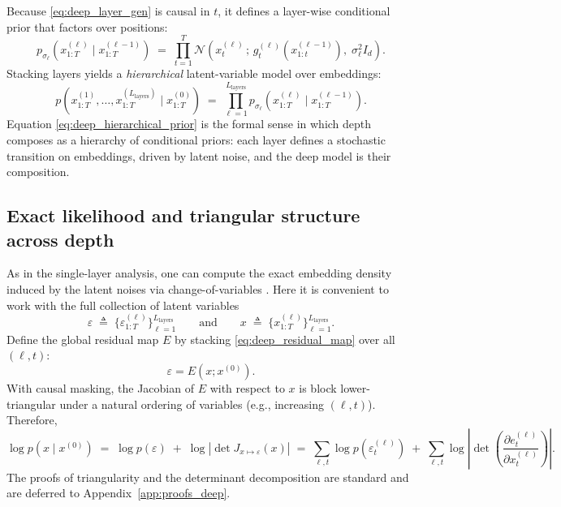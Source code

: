 \documentclass[11pt]{article}
\begin{document}
Because \eqref{eq:deep_layer_gen} is causal in $t$, it defines a layer-wise conditional prior that factors
over positions:
\begin{equation}
p_{\sigma_\ell}\!\left(x^{(\ell)}_{1:T}\mid x^{(\ell-1)}_{1:T}\right)
\;=\;
\prod_{t=1}^T
\mathcal{N}\!\left(
x^{(\ell)}_t \,;\,
g^{(\ell)}_t(x^{(\ell-1)}_{1:t}),
\;\sigma_\ell^2 I_d
\right).
\label{eq:layer_conditional_prior}
\end{equation}
Stacking layers yields a \emph{hierarchical} latent-variable model over embeddings:
\begin{equation}
p\!\left(x^{(1)}_{1:T},\dots,x^{(L_{\mathrm{layers}})}_{1:T}\mid x^{(0)}_{1:T}\right)
\;=\;
\prod_{\ell=1}^{L_{\mathrm{layers}}}
p_{\sigma_\ell}\!\left(x^{(\ell)}_{1:T}\mid x^{(\ell-1)}_{1:T}\right).
\label{eq:deep_hierarchical_prior}
\end{equation}
Equation \eqref{eq:deep_hierarchical_prior} is the formal sense in which depth composes as a hierarchy
of conditional priors: each layer defines a stochastic transition on embeddings, driven by latent noise,
and the deep model is their composition.

\subsection{Exact likelihood and triangular structure across depth}
\label{subsec:deep_loglik}

As in the single-layer analysis, one can compute the exact embedding density induced by the latent noises
via change-of-variables \citep{PapamakariosNaReMoLa21}. Here it is convenient to work with the full collection of latent variables
\[
\varepsilon \;\triangleq\; \{\varepsilon^{(\ell)}_{1:T}\}_{\ell=1}^{L_{\mathrm{layers}}}
\qquad\text{and}\qquad
x \;\triangleq\; \{x^{(\ell)}_{1:T}\}_{\ell=1}^{L_{\mathrm{layers}}}.
\]
Define the global residual map $E$ by stacking \eqref{eq:deep_residual_map} over all $(\ell,t)$:
\[
\varepsilon = E(x; x^{(0)}).
\]
With causal masking, the Jacobian of $E$ with respect to $x$ is block lower-triangular under a natural
ordering of variables (e.g., increasing $(\ell,t)$). Therefore,
\begin{equation}
\log p(x\mid x^{(0)})
\;=\;
\log p(\varepsilon)
\;+\;
\log\left|\det J_{x\mapsto\varepsilon}(x)\right|
\;=\;
\sum_{\ell,t}\log p(\varepsilon^{(\ell)}_t)
\;+\;
\sum_{\ell,t}\log\left|\det\!\left(\frac{\partial e^{(\ell)}_t}{\partial x^{(\ell)}_t}\right)\right|.
\label{eq:deep_logdet_decomp}
\end{equation}
The proofs of triangularity and the determinant decomposition are standard and are deferred to
Appendix~\ref{app:proofs_deep}.
\end{document}
